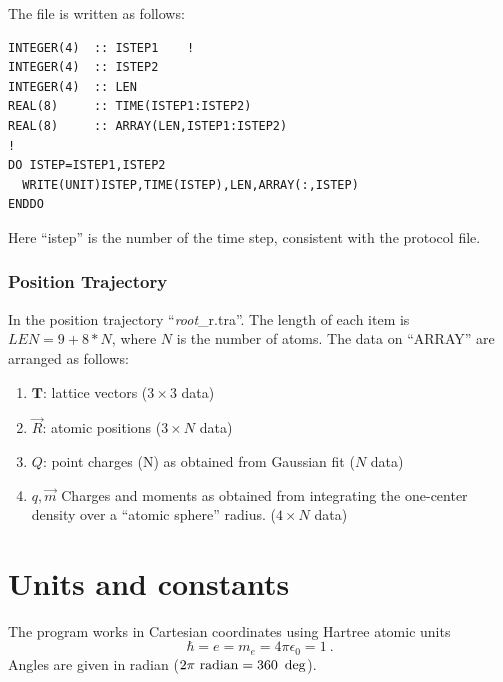 \documentclass[final,12pt]{article}
\begin{document}
{{{{{{The file is written as follows:
\begin{verbatim}
INTEGER(4)  :: ISTEP1    !
INTEGER(4)  :: ISTEP2
INTEGER(4)  :: LEN
REAL(8)     :: TIME(ISTEP1:ISTEP2)
REAL(8)     :: ARRAY(LEN,ISTEP1:ISTEP2)
!
DO ISTEP=ISTEP1,ISTEP2
  WRITE(UNIT)ISTEP,TIME(ISTEP),LEN,ARRAY(:,ISTEP)
ENDDO
\end{verbatim}

Here ``istep'' is the number of the time step, consistent with the
protocol file. 

\subsubsection{Position Trajectory}
In the position trajectory ``{\it root}\_r.tra''. The length of each
item is $LEN=9+8*N$, where $N$ is the number of atoms. The data on
``ARRAY'' are arranged as follows:
\begin{enumerate}
\item $\mathbf{T}$: lattice vectors ($3\times3$ data)
\item $\vec{R}$: atomic positions ($3\times N$ data)
\item $Q$: point charges (N) as obtained from Gaussian fit ($N$ data)
\item $q,\vec{m}$ Charges and moments as obtained from integrating the
  one-center density over a ``atomic sphere'' radius. ($4\times N$ data)
\end{enumerate}





\newpage
\section{Units and constants}
\label{constants}

The program works in Cartesian coordinates using Hartree atomic units
\begin{equation}
\hbar=e=m_e=4\pi\epsilon_0=1 \ .
\end{equation}
Angles are given in radian ($2\pi~{\rm radian}=360~\deg$).

}}}}}}
\end{document}

